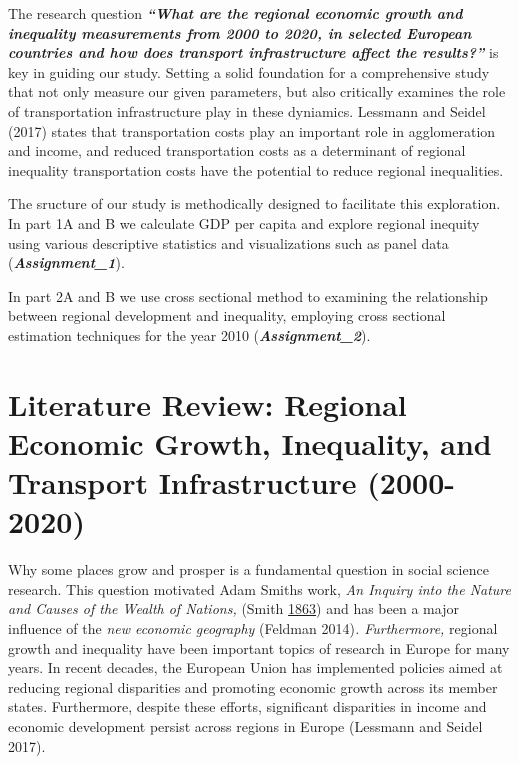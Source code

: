 \documentclass[
  a4paper,
  DIV=11,
  numbers=noendperiod]{scrartcl}
\begin{document}
The research question \textbf{\emph{``What are the regional economic
growth and inequality measurements from 2000 to 2020, in selected
European countries and how does transport infrastructure affect the
results?''}} is key in guiding our study. Setting a solid foundation for
a comprehensive study that not only measure our given parameters, but
also critically examines the role of transportation infrastructure play
in these dyniamics. Lessmann and Seidel (2017) states that
transportation costs play an important role in agglomeration and income,
and reduced transportation costs as a determinant of regional inequality
transportation costs have the potential to reduce regional inequalities.

The sructure of our study is methodically designed to facilitate this
exploration. In part 1A and B we calculate GDP per capita and explore
regional inequity using various descriptive statistics and
visualizations such as panel data (\textbf{\emph{Assignment\_1}}).

In part 2A and B we use cross sectional method to examining the
relationship between regional development and inequality, employing
cross sectional estimation techniques for the year 2010
(\textbf{\emph{Assignment\_2}}).

\hypertarget{literature-review-regional-economic-growth-inequality-and-transport-infrastructure-2000-2020}{%
\section{Literature Review: Regional Economic Growth, Inequality, and
Transport Infrastructure
(2000-2020)}\label{literature-review-regional-economic-growth-inequality-and-transport-infrastructure-2000-2020}}

Why some places grow and prosper is a fundamental question in social
science research. This question motivated Adam Smith\textquotesingle s
work, \emph{An Inquiry into the Nature and Causes of the Wealth of
Nations,} (Smith
\href{https://link-springer-com.galanga.hvl.no/article/10.1007/s11187-014-9574-4\#ref-CR32}{1863})
and has been a major influence of the \emph{new economic geography}
(Feldman 2014)\emph{. Furthermore,} regional growth and inequality have
been important topics of research in Europe for many years. In recent
decades, the European Union has implemented policies aimed at reducing
regional disparities and promoting economic growth across its member
states. Furthermore, despite these efforts, significant disparities in
income and economic development persist across regions in Europe
(Lessmann and Seidel 2017).
\end{document}
